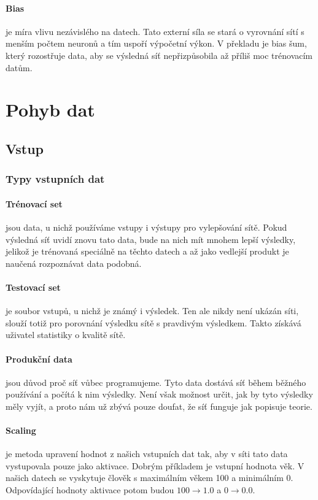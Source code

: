 \documentclass[12pt,a4paper]{report}
\begin{document}
	\paragraph{Bias}
	je míra vlivu nezávislého na datech. Tato externí síla se stará o vyrovnání sítí s menším počtem neuronů a tím uspoří výpočetní výkon. V překladu je bias šum, který rozostřuje data, aby se výsledná síť nepřizpůsobila až příliš moc trénovacím datům.
		
\section{Pohyb dat}
	\subsection{Vstup}
		\subsubsection{Typy vstupních dat}
			\paragraph{Trénovací set}
			jsou data, u nichž používáme vstupy i výstupy pro vylepšování sítě. Pokud výsledná síť uvidí znovu tato data, bude na nich mít mnohem lepší výsledky, jelikož je trénovaná speciálně na těchto datech a až jako vedlejší produkt je naučená rozpoznávat data podobná.
			\paragraph{Testovací set}
			je soubor vstupů, u nichž je známý i výsledek. Ten ale nikdy není ukázán síti, slouží totiž pro porovnání výsledku sítě s pravdivým výsledkem. Takto získává uživatel statistiky o kvalitě sítě.
			\paragraph{Produkční data}
			jsou důvod proč síť vůbec programujeme. Tyto data dostává síť během běžného používání a počítá k nim výsledky. Není však možnost určit, jak by tyto výsledky měly vyjít, a proto nám už zbývá pouze doufat, že síť funguje jak popisuje teorie.
		\paragraph{Scaling}
		je metoda upravení hodnot z našich vstupních dat tak, aby v síti tato data vystupovala pouze jako aktivace. Dobrým příkladem je vstupní hodnota věk. V našich datech se vyskytuje člověk s maximálním věkem 100 a minimálním 0. Odpovídající hodnoty aktivace potom budou $100\rightarrow1.0$ a $0\rightarrow0.0$.
\end{document}
